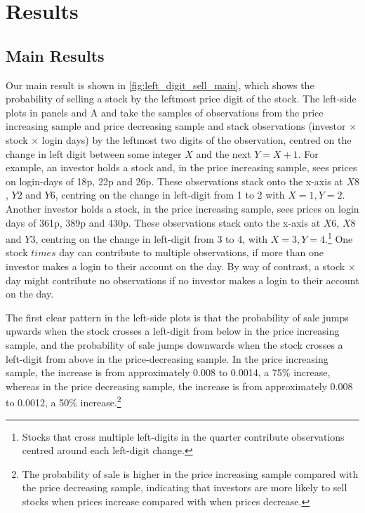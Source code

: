 \section{Results}

\subsection{Main Results}

Our main result is shown in \ref{fig:left_digit_sell_main}, which shows the probability of selling a stock by the leftmost price digit of the stock. The left-side plots in panels and A and take the samples of observations from the price increasing sample and price decreasing sample and stack observations (investor $\times$ stock $\times$ login days) by the leftmost two digits of the observation, centred on the change in left digit between some integer $X$ and the next $Y = X + 1$. For example, an investor holds a stock and, in the price increasing sample, sees prices on login-days of 18p, 22p and 26p. These observations stack onto the x-axis at $X8$, $Y2$ and $Y6$, centring on the change in left-digit from 1 to 2 with $X = 1 , Y = 2$. Another investor holds a stock, in the price increasing sample, sees prices on login days of 361p, 389p and 430p. These observations stack onto the x-axis at $X6$, $X8$ and $Y3$, centring on the change in left-digit from 3 to 4, with $X = 3 , Y = 4$.\footnote{Stocks that cross multiple left-digits in the quarter contribute observations centred around each left-digit change.} One stock $times$ day can contribute to multiple observations, if more than one investor makes a login to their account on the day. By way of contrast, a stock $\times$ day might contribute no observations if no investor makes a login to their account on the day.

The first clear pattern in the left-side plots is that the probability of sale jumps upwards when the stock crosses a left-digit from below in the price increasing sample, and the probability of sale jumps downwards when the stock crosses a left-digit from above in the price-decreasing sample. In the price increasing sample, the increase is from approximately 0.008 to 0.0014, a 75\% increase, whereas in the price decreasing sample, the increase is from approximately 0.008 to 0.0012, a 50\% increase.\footnote{The probability of sale is higher in the price increasing sample compared with the price decreasing sample, indicating that investors are more likely to sell stocks when prices increase compared with when prices decrease.} 


